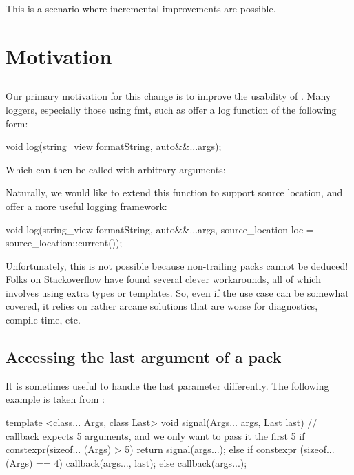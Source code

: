 \documentclass{wg21}
\begin{document}
This is a scenario where incremental improvements are possible.

\section{Motivation}

\subsection{}

Our primary motivation for this change is to improve the usability of .
Many loggers, especially those using fmt, such as  offer a log function of the following form:

\begin{colorblock}
void log(string_view formatString, auto&&...args);
\end{colorblock}
Which can then be called with arbitrary arguments: 

Naturally, we would like to extend this function to support source location, and offer a more useful logging framework:

\begin{colorblock}
void log(string_view formatString, auto&&...args, source_location loc = source_location::current());
\end{colorblock}

Unfortunately, this is not possible because non-trailing packs cannot be deduced!
Folks on \href{https://stackoverflow.com/questions/57547273/how-to-use-source-location-in-a-variadic-template-function}{Stackoverflow} have found several clever workarounds, all of which involves using extra types or templates.
So, even if the use case can be somewhat covered, it relies on rather arcane solutions that are worse for diagnostics, compile-time, etc.

\subsection{Accessing the last argument of a pack}

It is sometimes useful to handle the last parameter differently.
The following example is taken from :

\begin{colorblock}
template <class... Args, class Last>
void signal(Args... args, Last last) {
    // callback expects 5 arguments, and we only want to pass it the first 5
    if constexpr(sizeof... (Args) > 5) {
        return signal(args...);
    } else if constexpr (sizeof... (Args) == 4) {
        callback(args..., last);
    } else {
        callback(args...);
    }
}
\end{colorblock}
\end{document}
